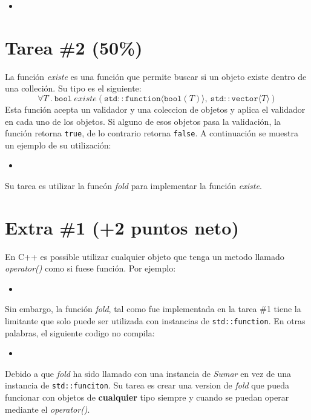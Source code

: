 \documentclass{article}
\newcommand{\perlscript}[2]{
\begin{itemize}
\item[]
\end{itemize}
}
\begin{document}
\perlscript{fold.cc}{}

\section*{Tarea \#2 (50\%)}

La funci\'on \emph{existe} es una funci\'on que permite buscar si un objeto existe dentro de una
colleci\'on. Su tipo es el siguiente:
\[
        \forall T\ .\ \mathtt{bool}\ existe(\mathtt{std::function}\langle \mathtt{bool}(T)\rangle,\ \mathtt{std::vector}\langle T \rangle)
\]
Esta funci\'on acepta un validador y una coleccion de objetos y aplica el validador en cada uno
de los objetos. Si alguno de esos objetos pasa la validaci\'on, la funci\'on retorna \texttt{true},
de lo contrario retorna \texttt{false}. A continuaci\'on se muestra un ejemplo de su utilizaci\'on:
\perlscript{find.cc}{}

Su tarea es utilizar la func\'on \emph{fold} para implementar la funci\'on \emph{existe}.

\section*{Extra \#1 (+2 puntos neto)}

En C++ es possible utilizar cualquier objeto que tenga un metodo llamado \emph{operator()} como
si fuese funci\'on. Por ejemplo:
\perlscript{operator.cc}{}

Sin embargo, la funci\'on \emph{fold}, tal como fue implementada en la tarea \#1 tiene la limitante
que solo puede ser utilizada con instancias de \texttt{std::function}. En otras palabras, el siguiente
codigo no compila:
\perlscript{mal.cc}{}

Debido a que \emph{fold} ha sido llamado con una instancia de \emph{Sumar} en vez de una instancia
de \texttt{std::funciton}. Su tarea es crear una version de \emph{fold} que pueda funcionar con
objetos de {\bf cualquier} tipo siempre y cuando se puedan operar mediante el \emph{operator()}. 
\end{document}
